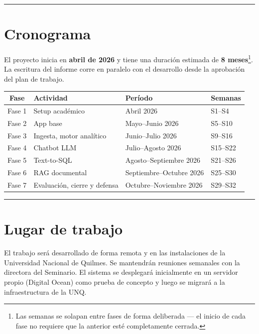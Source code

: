 \documentclass[
  spanish,
]{article}
\begin{document}
\begin{center}\rule{0.5\linewidth}{0.5pt}\end{center}

\section{Cronograma}\label{cronograma}

El proyecto inicia en \textbf{abril de 2026} y tiene una duración
estimada de \textbf{8 meses}\footnote{Las semanas se solapan entre
fases de forma deliberada --- el inicio de cada fase no requiere que
la anterior esté completamente cerrada.}. La escritura del informe
corre en paralelo con el desarrollo desde la aprobación del plan de
trabajo.

\begin{center}
{\renewcommand{\arraystretch}{1.2}
\begin{tabular}{@{}clll@{}}
\toprule
\textbf{Fase} & \textbf{Actividad} & \textbf{Período} & \textbf{Semanas} \\
\midrule
Fase 1 & Setup académico              & Abril 2026                & S1--S4   \\
Fase 2 & App base                     & Mayo--Junio 2026          & S5--S10  \\
Fase 3 & Ingesta, motor analítico     & Junio--Julio 2026         & S9--S16  \\
Fase 4 & Chatbot LLM                  & Julio--Agosto 2026        & S15--S22 \\
Fase 5 & Text-to-SQL                  & Agosto--Septiembre 2026   & S21--S26 \\
Fase 6 & RAG documental               & Septiembre--Octubre 2026  & S25--S30 \\
Fase 7 & Evaluación, cierre y defensa & Octubre--Noviembre 2026   & S29--S32 \\
\bottomrule
\end{tabular}}
\end{center}

\begin{center}\rule{0.5\linewidth}{0.5pt}\end{center}

\section{Lugar de trabajo}\label{lugar-de-trabajo}

El trabajo será desarrollado de forma remota y en las instalaciones de
la Universidad Nacional de Quilmes. Se mantendrán reuniones semanales
con la directora del Seminario. El sistema se desplegará inicialmente en
un servidor propio (Digital Ocean) como prueba de concepto y luego se
migrará a la infraestructura de la UNQ.
\end{document}
